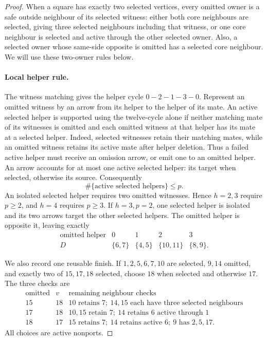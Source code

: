 \begin{proof}
When a square has exactly two selected vertices, every omitted owner is a
safe outside neighbour of its selected witness: either both core neighbours
are selected, giving three selected neighbours including that witness, or
one core neighbour is selected and active through the other selected owner.
Also, a selected owner whose same-side opposite is omitted has a selected
core neighbour. We will use these two-owner rules below.

\paragraph{Local helper rule.}
The witness matching gives the helper cycle $0-2-1-3-0$. Represent an
omitted witness by an arrow from its helper to the helper of its mate.
An active selected helper is supported using the twelve-cycle alone if
neither matching mate of its witnesses is omitted and each omitted witness
at that helper has its mate at a selected helper. Indeed, selected witnesses
retain their matching mates, while an omitted witness retains its active
mate after helper deletion. Thus a failed active helper must receive an
omission arrow, or emit one to an omitted helper. An arrow accounts for at
most one active selected helper: its target when selected, otherwise its
source. Consequently
\begin{equation}\label{eq:twenty-helpers}
 \#\{\text{active selected helpers}\}\le p.
\end{equation}
An isolated selected helper requires two omitted witnesses. Hence $h=2,3$
require $p\ge2$, and $h=4$ requires $p\ge3$. If $h=3,p=2$, one selected
helper is isolated and its two arrows target the other selected helpers.
The omitted helper is opposite it, leaving exactly
\begin{equation}\label{eq:twenty-h3-p2}
\begin{array}{c|cccc}
\text{omitted helper}&0&1&2&3\\\hline
D&\{6,7\}&\{4,5\}&\{10,11\}&\{8,9\}.
\end{array}
\end{equation}

We also record one reusable finish. If $1,2,5,6,7,10$ are selected,
$9,14$ omitted, and exactly two of $15,17,18$ selected, choose $18$ when
selected and otherwise $17$. The three checks are
\[
\begin{array}{c|c|l}
\text{omitted}&v&\text{remaining neighbour checks}\\\hline
15&18&10\text{ retains }7;\ 14,15\text{ each have three selected neighbours}\\
17&18&10,15\text{ retain }7;\ 14\text{ retains }6\text{ active through }1\\
18&17&15\text{ retains }7;\ 14\text{ retains active }6;\ 9\text{ has }2,5,17.
\end{array}
\]
All choices are active nonports.


\end{proof}
